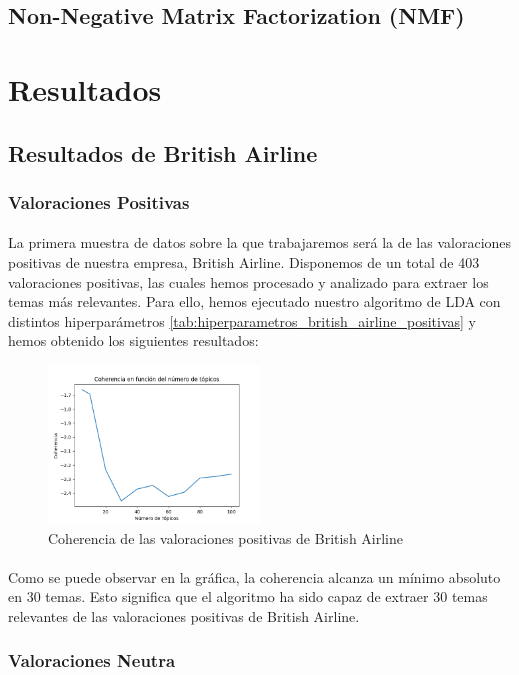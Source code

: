\documentclass{report}
\begin{document}
{{            \subsection{Non-Negative Matrix Factorization (NMF)}
        \clearpage\section{Resultados}
            \subsection{Resultados de British Airline}
                \subsubsection*{Valoraciones Positivas}
                    \paragraph*{}{
                        La primera muestra de datos sobre la que trabajaremos será la de las valoraciones positivas de nuestra empresa, British Airline.
                        Disponemos de un total de 403 valoraciones positivas, las cuales hemos procesado y analizado para extraer los temas más relevantes.
                        Para ello, hemos ejecutado nuestro algoritmo de LDA con distintos hiperparámetros \ref{tab:hiperparametros_british_airline_positivas} y hemos obtenido los siguientes resultados: 
                    }
                    \begin{figure}[H]
                        \centering
                        \includegraphics[width=0.5\textwidth]{./img/british_airline_positivas.png}
                        \caption{Coherencia de las valoraciones positivas de British Airline}
                    \end{figure}
                    \paragraph*{}{
                        Como se puede observar en la gráfica, la coherencia alcanza un mínimo absoluto en 30 temas.
                        Esto significa que el algoritmo ha sido capaz de extraer 30 temas relevantes de las valoraciones positivas de British Airline. 
                    }
                \clearpage\subsubsection*{Valoraciones Neutra}
}}
\end{document}

